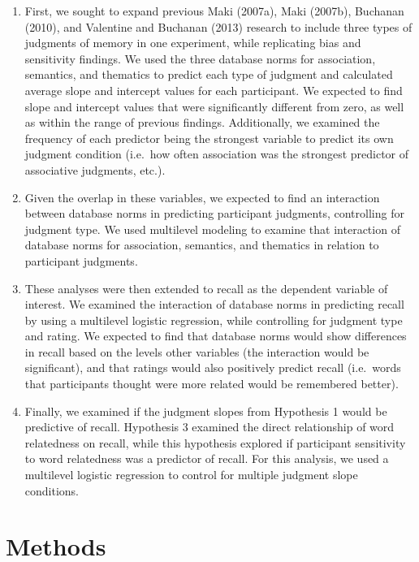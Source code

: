 \documentclass[english,man]{apa6}
\theoremstyle{definition}
\theoremstyle{definition}
\theoremstyle{remark}
\begin{document}
\begin{enumerate}
\def\labelenumi{\arabic{enumi})}
\item
  First, we sought to expand previous Maki (2007a), Maki (2007b),
  Buchanan (2010), and Valentine and Buchanan (2013) research to include
  three types of judgments of memory in one experiment, while
  replicating bias and sensitivity findings. We used the three database
  norms for association, semantics, and thematics to predict each type
  of judgment and calculated average slope and intercept values for each
  participant. We expected to find slope and intercept values that were
  significantly different from zero, as well as within the range of
  previous findings. Additionally, we examined the frequency of each
  predictor being the strongest variable to predict its own judgment
  condition (i.e.~how often association was the strongest predictor of
  associative judgments, etc.).
\item
  Given the overlap in these variables, we expected to find an
  interaction between database norms in predicting participant
  judgments, controlling for judgment type. We used multilevel modeling
  to examine that interaction of database norms for association,
  semantics, and thematics in relation to participant judgments.
\item
  These analyses were then extended to recall as the dependent variable
  of interest. We examined the interaction of database norms in
  predicting recall by using a multilevel logistic regression, while
  controlling for judgment type and rating. We expected to find that
  database norms would show differences in recall based on the levels
  other variables (the interaction would be significant), and that
  ratings would also positively predict recall (i.e.~words that
  participants thought were more related would be remembered better).
\item
  Finally, we examined if the judgment slopes from Hypothesis 1 would be
  predictive of recall. Hypothesis 3 examined the direct relationship of
  word relatedness on recall, while this hypothesis explored if
  participant sensitivity to word relatedness was a predictor of recall.
  For this analysis, we used a multilevel logistic regression to control
  for multiple judgment slope conditions.
\end{enumerate}

\section{Methods}\label{methods}
\end{document}

